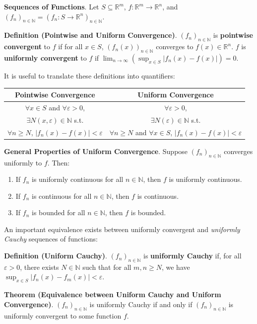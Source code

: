 \begin{shaded}
    \textbf{Sequences of Functions}. Let $S\subseteq\mathbb{R}^m$, $f:\mathbb{R}^m\to \mathbb{R}^n$, and $(f_n)_{n\in\mathbb{N}} = (f_n:S\to\mathbb{R}^n)_{n\in\mathbb{N}}$.

    \textbf{Definition (Pointwise and Uniform Convergence)}. $(f_n)_{n\in\mathbb{N}}$ is \textbf{pointwise convergent} to $f$ if for all $x\in S$, $(f_n(x))_{n\in\mathbb{N}}$ converges to $f(x)\in\mathbb{R}^n$. $f$ is \textbf{uniformly convergent} to $f$ if $\displaystyle\lim_{n\to\infty} \left(\sup_{x\in S}\left|f_n(x)-f(x)\right|\right) = 0$.

    It is useful to translate these definitions into quantifiers:

    \begin{center}
        \begin{tabular}{c|c}
            \textbf{Pointwise Convergence} & \textbf{Uniform Convergence} \\
            \hline\hline
            $\forall x\in S$ and $\forall\varepsilon>0$, &  $\forall\varepsilon>0$,\\
            $\exists N(x,\varepsilon)\in\mathbb{N}$ s.t. & $\exists N(\varepsilon)\in\mathbb{N}$ s.t. \\
            $\forall n\geq N$, $|f_n(x)-f(x)|<\varepsilon$ & $\forall n\geq N$ and $\forall x\in S$, $|f_n(x)-f(x)|<\varepsilon$
        \end{tabular}
    \end{center}
    \textbf{General Properties of Uniform Convergence}. Suppose $(f_n)_{n\in\mathbb{N}}$ converges uniformly to $f$. Then: \begin{enumerate}
        \item[1.] If $f_n$ is uniformly continuous for all $n\in\mathbb{N}$, then $f$ is uniformly continuous.
        \item[2.] If $f_n$ is continuous for all $n\in\mathbb{N}$, then $f$ is continuous.
        \item[3.] If $f_n$ is bounded for all $n\in\mathbb{N}$, then $f$ is bounded.
    \end{enumerate} An important equivalence exists between uniformly convergent and \textit{uniformly Cauchy} sequences of functions:

    \textbf{Definition (Uniform Cauchy)}. $(f_n)_{n\in\mathbb{N}}$ is \textbf{uniformly Cauchy} if, for all $\varepsilon>0$, there exists $N\in\mathbb{N}$ such that for all $m,n\geq N$, we have $\displaystyle\sup_{x\in S} \left|f_n(x)-f_m(x)\right|<\varepsilon$.

    \textbf{Theorem (Equivalence between Uniform Cauchy and Uniform Convergence)}. $(f_n)_{n\in\mathbb{N}}$ is uniformly Cauchy if and only if $(f_n)_{n\in\mathbb{N}}$ is uniformly convergent to some function $f$.
\end{shaded}

